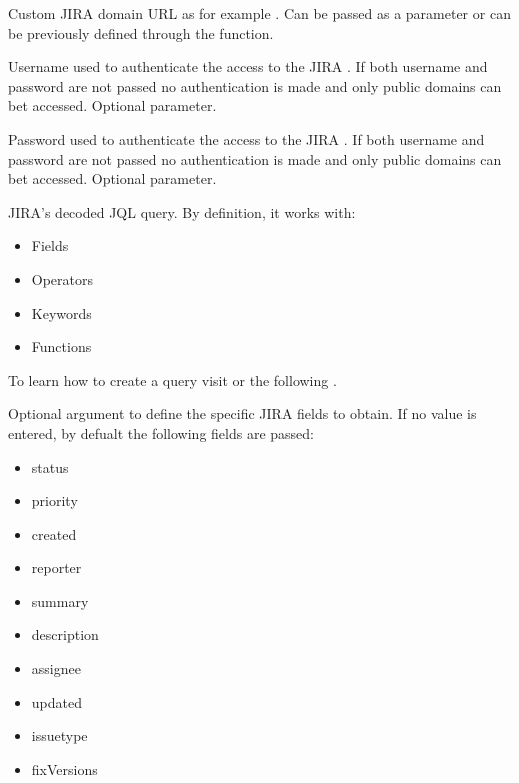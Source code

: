 \documentclass[a4paper]{book}
\begin{document}
%
\begin{Arguments}
\begin{ldescription}
\item[\code{domain}] Custom JIRA domain URL as for example . Can be passed as a parameter or can be previously defined through the  function.

\item[\code{username}] Username used to authenticate the access to the JIRA . If both username and password are not passed no authentication is made and only public domains can bet accessed. Optional parameter.

\item[\code{password}] Password used to authenticate the access to the JIRA . If both username and password are not passed no authentication is made and only public domains can bet accessed. Optional parameter.

\item[\code{jql\_query}] JIRA's decoded JQL query. By definition, it works with:
\begin{itemize}

\item{} Fields
\item{} Operators
\item{} Keywords
\item{} Functions

\end{itemize}

To learn how to create a query visit  or the following .

\item[\code{fields}] Optional argument to define the specific JIRA fields to obtain. If no value is entered, by defualt the following fields are passed:
\begin{itemize}

\item{} status
\item{} priority
\item{} created
\item{} reporter
\item{} summary
\item{} description
\item{} assignee
\item{} updated
\item{} issuetype
\item{} fixVersions


\end{itemize}
\end{ldescription}
\end{Arguments}
\end{document}
